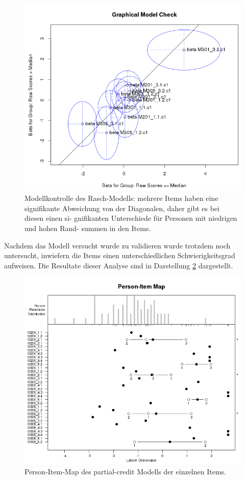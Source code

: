 \begin{figure}[htp]
   \centering
   \includegraphics[width=1.0\linewidth]{graphics/GOF.png}
   \caption{Modellkontrolle des Rasch-Modells: mehrere Items haben eine
   signifikante Abweichung von der Diagonalen, daher gibt es bei diesen einen si-
   gnifikanten Unterschiede für Personen mit niedrigen und hohen Rand-
   summen in den Items.}
   \label{fig:GOF}
\end{figure}


Nachdem das Modell versucht wurde zu validieren wurde trotzdem noch untersucht, inwiefern die Items einen unterschiedlichen Schwierigkeitsgrad aufweisen. Die Resultate dieser Analyse sind in Darstellung \ref{fig:PIM} dargestellt.



\begin{figure}[htp]
   \centering
   \includegraphics[width=1.0\linewidth]{graphics/PersonItemMap.png}
   \caption{Person-Item-Map des partial-credit Modells der einzelnen Items.}
   \label{fig:PIM}
\end{figure}

